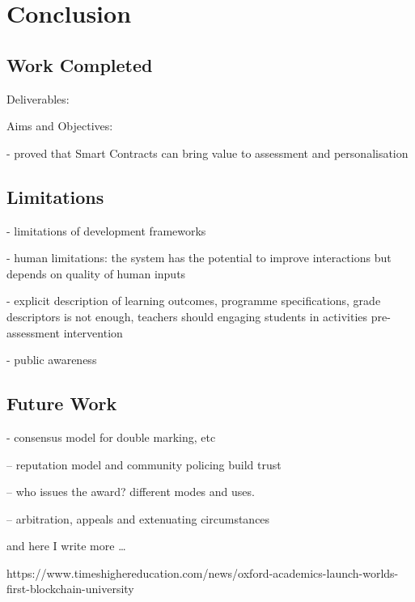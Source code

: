 \chapter{Conclusion}

\section{Work Completed}

Deliverables:

Aims and Objectives:

- proved that Smart Contracts can bring value to assessment and personalisation

\section{Limitations}

- limitations of development frameworks

- human limitations: the system has the potential to improve interactions but depends on quality of human inputs 

- explicit description of learning outcomes, programme specifications, grade descriptors is not enough, teachers should
engaging students in activities pre-assessment intervention \citep{bryan2006innovative}

- public awareness

\section{Future Work}


- consensus model for double marking, etc

-- reputation model and community policing build trust

-- who issues the award? different modes and uses. 

-- arbitration, appeals and extenuating circumstances



and here I write more \dots

https://www.timeshighereducation.com/news/oxford-academics-launch-worlds-first-blockchain-university